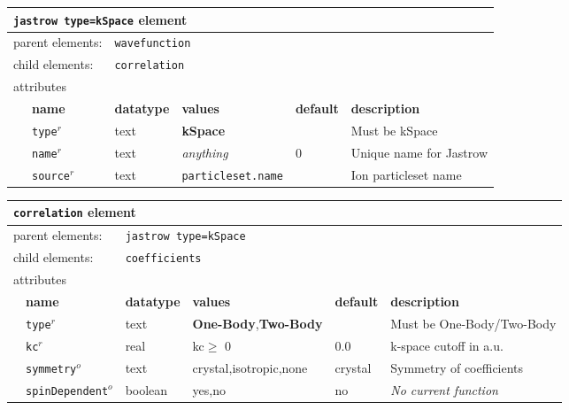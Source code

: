 \FloatBarrier
\begin{table}[h]
\begin{center}
\begin{tabularx}{\textwidth}{l l l l l l }
\hline
\multicolumn{6}{l}{\texttt{jastrow type=kSpace} element} \\
\hline
\multicolumn{2}{l}{parent elements:} & \multicolumn{4}{l}{\texttt{wavefunction}}\\
\multicolumn{2}{l}{child  elements:} & \multicolumn{4}{l}{\texttt{correlation}}\\
\multicolumn{2}{l}{attributes}  & \multicolumn{4}{l}{}\\
   &   \bfseries name     & \bfseries datatype & \bfseries values          & \bfseries default  & \bfseries description \\
   & \texttt{type}$^r$    &  text              & \textbf{kSpace}           &                    & Must be kSpace           \\
   & \texttt{name}$^r$    &  text              & \textit{anything}         & 0                  & Unique name for Jastrow \\
   & \texttt{source}$^r$  &  text              & \texttt{particleset.name} &                    & Ion particleset name\\
  \hline
\end{tabularx}
\end{center}
\end{table}
\FloatBarrier

\FloatBarrier
\begin{table}[h]
\begin{center}
\begin{tabularx}{\textwidth}{l l l l l l }
\hline
\multicolumn{6}{l}{\texttt{correlation} element} \\
\hline
\multicolumn{2}{l}{parent elements:} & \multicolumn{4}{l}{\texttt{jastrow type=kSpace}}\\
\multicolumn{2}{l}{child  elements:} & \multicolumn{4}{l}{\texttt{coefficients}}\\
\multicolumn{2}{l}{attributes}  & \multicolumn{4}{l}{}\\
   &   \bfseries name           & \bfseries datatype & \bfseries values  & \bfseries default  & \bfseries description \\
   & \texttt{type}$^r$          &  text              & \textbf{One-Body},\textbf{Two-Body}    &                     & Must be One-Body/Two-Body     \\
   & \texttt{kc}$^r$            &  real              & kc$\ge$ 0                                & 0.0                 & k-space cutoff in a.u. \\
   & \texttt{symmetry}$^o$      &  text              & crystal,isotropic,none                 & crystal             & Symmetry of coefficients\\
   & \texttt{spinDependent}$^o$ &  boolean           & yes,no                                 & no                  & \textit{No current function} \\
  \hline
\end{tabularx}
\end{center}
\end{table}
\FloatBarrier

